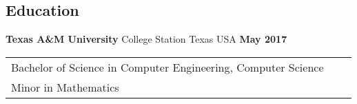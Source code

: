 \documentclass[resmargin,line,12pt]{res}
\newenvironment{list1}{
\begin{list}{\ding{113}}{%
  \setlength{\itemsep}{0in}
  \setlength{\parsep}{0in} \setlength{\parskip}{0in}
  \setlength{\topsep}{0in} \setlength{\partopsep}{0in}
  \setlength{\leftmargin}{0.17in}}}{\end{list}}
\newenvironment{list2}{
\begin{list}{$\bullet$}{%
  \setlength{\itemsep}{0in}
  \setlength{\parsep}{0in} \setlength{\parskip}{0in}
  \setlength{\topsep}{0in} \setlength{\partopsep}{0in}
  \setlength{\leftmargin}{0.2in}}}{\end{list}}
\begin{document}
{\begin{resume}
\color{black}
{\color{Black}
  \vspace{-.1in}
  \section{\sc Education}}

{\bf Texas A\&M University} College Station Texas USA \hfill {\bf May 2017} \ \\
\vspace*{-.17in}
\begin{tabular}{l l l}
  Bachelor of Science in Computer Engineering, Computer Science \\
  Minor in Mathematics \\
\end{tabular}





\end{resume}}
\end{document}
